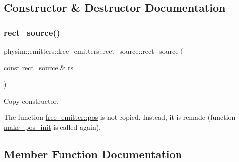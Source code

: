 \subsection{Constructor \& Destructor Documentation}
\mbox{\label{classphysim_1_1emitters_1_1free__emitters_1_1rect__source_a2aa2b82ecb8b46f6a5cda7c8b19f8f05}} 
\subsubsection{\texorpdfstring{rect\+\_\+source()}{rect\_source()}}
{\footnotesize\ttfamily physim\+::emitters\+::free\+\_\+emitters\+::rect\+\_\+source\+::rect\+\_\+source (\begin{DoxyParamCaption}\item[{const \hyperlink{classphysim_1_1emitters_1_1free__emitters_1_1rect__source}{rect\+\_\+source} \&}]{rs }\end{DoxyParamCaption})}



Copy constructor. 

The function \hyperlink{classphysim_1_1emitters_1_1base__emitter_ac67584a2ca34232c1f4f04c41599df0e}{free\+\_\+emitter\+::pos} is not copied. Instead, it is remade (function \hyperlink{classphysim_1_1emitters_1_1free__emitters_1_1rect__source_ab5109666862f8f49e18f06d9bf663901}{make\+\_\+pos\+\_\+init} is called again). 

\subsection{Member Function Documentation}
\mbox{\label{classphysim_1_1emitters_1_1free__emitters_1_1rect__source_ab5109666862f8f49e18f06d9bf663901}} 
